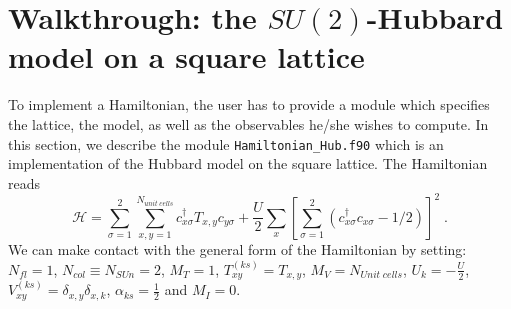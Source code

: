 \section{Walkthrough: the $SU(2)$-Hubbard model on a square lattice}\label{sec:walk1}
To implement a Hamiltonian, the user has to provide  a module   which  specifies the lattice, the model, as well as the observables  he/she  wishes to compute. 
In this section, we describe the module \texttt{Hamiltonian\_Hub.f90} which is an implementation of the Hubbard model on the square lattice. 
 The Hamiltonian reads 
\begin{equation}
\label{eqn_hubbard_sun}
\mathcal{H}=
\sum\limits_{\sigma=1}^{2} 
\sum\limits_{x,y =1 }^{N_{unit\; cells }} 
  c^{\dagger}_{x \sigma} T_{x,y}c^{\phantom\dagger}_{y \sigma} 
+ \frac{U}{2}\sum\limits_{x}\left[
\sum\limits_{\sigma=1}^{2}
\left(  c^{\dagger}_{x \sigma} c^{\phantom\dagger}_{x \sigma}  -1/2 \right) \right]^{2}\;.
\end{equation} 
We can make contact with the general form of the Hamiltonian by setting: 
$N_{fl} = 1$, $N_{col} \equiv N_{SUn}     =2 $,   $M_T    =    1$,  $T^{(ks)}_{x y}   =  T_{x,y}$,  $M_V   =  N_{Unit\; cells} $,  $U_{k}       =   -\frac{U}{2}$, 
 $V_{x y}^{(ks)} =  \delta_{x,y} \delta_{x,k}$,  $\alpha_{ks}   =  \frac{1}{2}  $ and $M_I       = 0 $.




